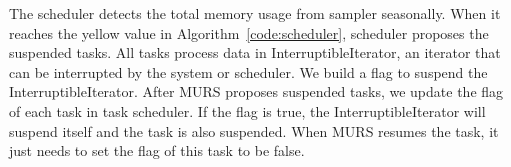 


The scheduler detects the total memory usage from sampler seasonally. When it reaches the yellow value in Algorithm~\ref{code:scheduler}, scheduler proposes the suspended tasks. All tasks process data in {\ttfamily \small InterruptibleIterator}, an iterator that can be interrupted by the system or scheduler. We build a flag to suspend the {\ttfamily \small InterruptibleIterator}. After MURS proposes suspended tasks, we update the flag of each task in task scheduler. If the flag is true, the {\ttfamily \small InterruptibleIterator} will suspend itself and the task is also suspended. When MURS resumes the task, it just needs to set the flag of this task to be false.

